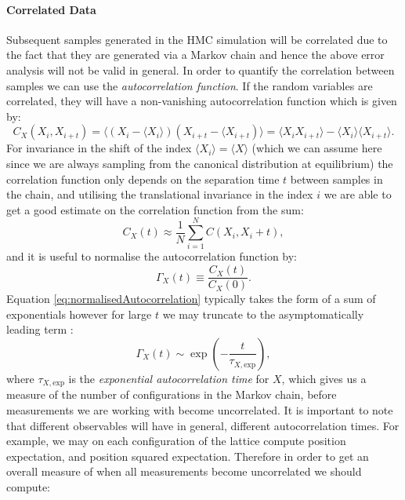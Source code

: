\documentclass[12pt]{article}
\begin{document}
            \paragraph{Correlated Data} Subsequent samples generated in the HMC simulation will be correlated due to the fact that they are generated via a Markov chain and hence the above error analysis will not be valid in general. In order to quantify the correlation between samples we can use the \textit{autocorrelation function}. If the random variables are correlated, they will have a non-vanishing autocorrelation function which is given by:
            \begin{equation}
                C_{X}\left(X_i,X_{i+t}\right) = \langle \left(X_i-\langle X_i\rangle\right)\left(X_{i+t}-\langle X_{i+t}\right)\rangle = \langle X_iX_{i+t}\rangle - \langle X_i \rangle \langle X_{i+t} \rangle.
            \end{equation}
            For invariance in the shift of the index $\langle X_i \rangle = \langle X \rangle$ (which we can assume here since we are always sampling from the canonical distribution at equilibrium) the correlation function only depends on the separation time $t$ between samples in the chain, and utilising the translational invariance in the index $i$ we are able to get a good estimate on the correlation function from the sum:
            \begin{equation}
                C_{X}\left(t\right) \approx \frac{1}{N}\sum_{i=1}^NC\left(X_i,X_i+t\right),
            \end{equation}
            and it is useful to normalise the autocorrelation function by:
            \begin{equation}
                \label{eq:normalisedAutocorrelation}
                \Gamma_{X}\left(t\right) \equiv \frac{C_X\left(t\right)}{C_X\left(0\right)}.
            \end{equation}
            Equation \ref{eq:normalisedAutocorrelation} typically takes the form of a sum of exponentials however for  large $t$  we may truncate to the asymptomatically leading term \cite{gattringer_lang_2013}:
            \begin{equation}
                \Gamma_{X}\left(t\right)\sim\exp\left(-\frac{t}{\tau_{X,\text{exp}}}\right),
            \end{equation}
            where $\tau_{X,\text{exp}}$ is the \textit{exponential autocorrelation time} for $X$, which gives us a measure of the number of configurations in the Markov chain, before measurements we are working with become uncorrelated. It is important to note that different observables will have in general, different autocorrelation times. For example, we may on each configuration of the lattice compute position expectation, and position squared expectation. Therefore in order to get an overall measure of when all measurements become uncorrelated we should compute:
\end{document}
